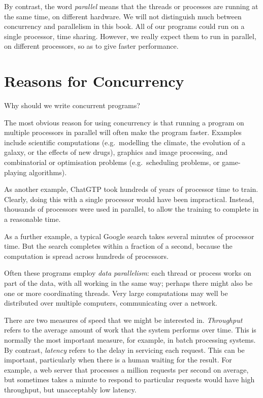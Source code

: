 By contrast, the word \emph{parallel} means that the threads
or processes are running at the same time, on different hardware.  We will not
distinguish much between concurrency and parallelism in this book.  All of our
programs could run on a single processor, time sharing.  However, we really
expect them to run in parallel, on different processors, so as to give faster
performance.


\section{Reasons for Concurrency}

Why should we write concurrent programs?

The most obvious reason for using concurrency is that running a program on
multiple processors in parallel will often make the program faster.  Examples
include scientific computations (e.g.~modelling the climate, the evolution of
a galaxy, or the effects of new drugs), graphics and image processing, and
combinatorial or optimisation problems (e.g.~scheduling problems, or
game-playing algorithms).


As another example, ChatGTP took hundreds of years of processor time
to train.  Clearly, doing this with a single processor would have been
impractical.  Instead, thousands of processors were used in parallel, to allow
the training to complete in a reasonable time.

As a further example, a typical Google search takes several minutes of
processor time.  But the search completes within a fraction of a second,
because the computation is spread across hundreds of processors.

Often these programs employ \emph{data parallelism}: each
thread or process works on part of the data, with all working in the same way;
perhaps there might also be one or more coordinating threads.  Very large
computations may well be distributed over multiple computers, communicating
over a network.

There are two measures of speed that we might be interested in.
\emph{Throughput} refers to the average amount of work that
the system performs over time.  This is normally the most important measure,
for example, in batch processing systems.  By
contrast, \emph{latency} refers to the delay in servicing each
request.  This can be important, particularly when there is a human waiting
for the result.  For example, a web server that processes a million requests
per second on average, but sometimes takes a minute to respond to particular
requests would have high throughput, but unacceptably low latency.

